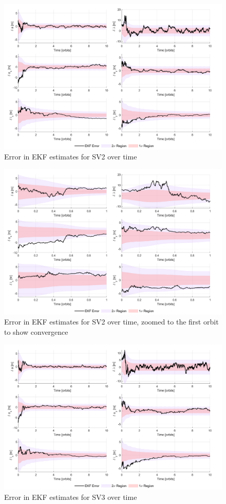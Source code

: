 \begin{figure}[H]
    \centering
    \includegraphics[width=0.7\linewidth]{sim/figures/PS8/EKF_error_SV2.png}
    \caption{Error in EKF estimates for SV2 over time}
    \label{fig:sv2_ekf_error}
\end{figure}

\begin{figure}[H]
    \centering
    \includegraphics[width=0.7\linewidth]{sim/figures/PS8/EKF_error_SV2_zoomed.png}
    \caption{Error in EKF estimates for SV2 over time, zoomed to the first orbit to show convergence}
    \label{fig:sv2_ekf_error_zoomed}
\end{figure}

\begin{figure}[H]
    \centering
    \includegraphics[width=0.7\linewidth]{sim/figures/PS8/EKF_error_SV3.png}
    \caption{Error in EKF estimates for SV3 over time}
    \label{fig:sv3_ekf_error}
\end{figure}

